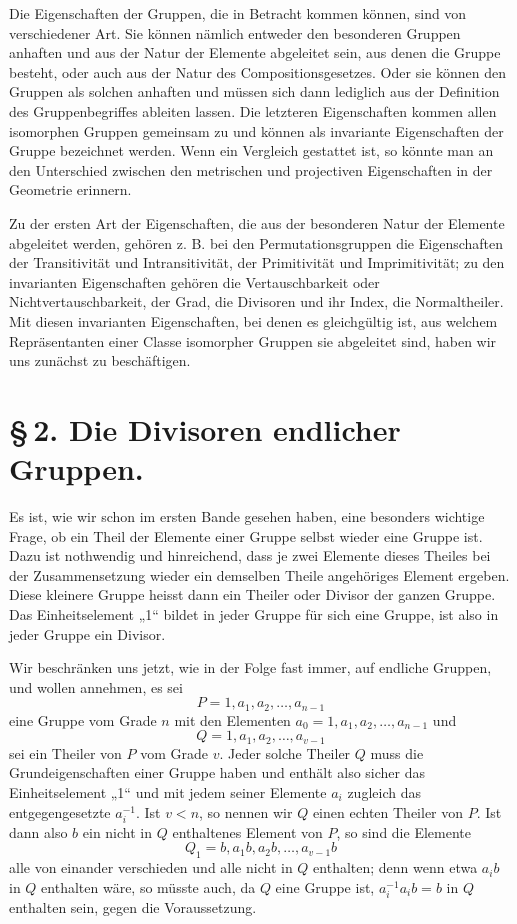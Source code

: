 \documentclass[11pt]{article}
\begin{document}
Die Eigenschaften der Gruppen, die in Betracht kommen können, sind von verschiedener Art. Sie können nämlich entweder den besonderen Gruppen anhaften und aus der Natur der Elemente abgeleitet sein, aus denen die Gruppe besteht, oder auch aus der Natur des Compositionsgesetzes. Oder sie können den Gruppen als solchen anhaften und müssen sich dann lediglich aus der Definition des Gruppenbegriffes ableiten lassen. Die letzteren Eigenschaften kommen allen isomorphen Gruppen gemeinsam zu und können als invariante Eigenschaften der Gruppe bezeichnet werden. Wenn ein Vergleich gestattet ist, so könnte man an den Unterschied zwischen den metrischen und projectiven Eigenschaften in der Geometrie erinnern.

Zu der ersten Art der Eigenschaften, die aus der besonderen Natur der Elemente abgeleitet werden, gehören z. B. bei den Permutationsgruppen die Eigenschaften der Transitivität und Intransitivität, der Primitivität und Imprimitivität; zu den invarianten Eigenschaften gehören die Vertauschbarkeit oder Nichtvertauschbarkeit, der Grad, die Divisoren und ihr Index, die Normaltheiler. Mit diesen invarianten Eigenschaften, bei denen es gleichgültig ist, aus welchem Repräsentanten einer Classe isomorpher Gruppen sie abgeleitet sind, haben wir uns zunächst zu beschäftigen.

\section*{\S\,2. Die Divisoren endlicher Gruppen.}

Es ist, wie wir schon im ersten Bande gesehen haben, eine besonders wichtige Frage, ob ein Theil der Elemente einer Gruppe selbst wieder eine Gruppe ist. Dazu ist nothwendig und hinreichend, dass je zwei Elemente dieses Theiles bei der Zusammensetzung wieder ein demselben Theile angehöriges Element ergeben. Diese kleinere Gruppe heisst dann ein Theiler oder Divisor der ganzen Gruppe. Das Einheitselement „1“ bildet in jeder Gruppe für sich eine Gruppe, ist also in jeder Gruppe ein Divisor.

Wir beschränken uns jetzt, wie in der Folge fast immer, auf endliche Gruppen, und wollen annehmen, es sei
\[
P=1,a_1,a_2,\ldots,a_{n-1}
\]
eine Gruppe vom Grade $n$ mit den Elementen $a_0=1,a_1,a_2,\ldots,a_{n-1}$ und
\[
Q=1,a_1,a_2,\ldots,a_{v-1}
\]
sei ein Theiler von $P$ vom Grade $v$. Jeder solche Theiler $Q$ muss die Grundeigenschaften einer Gruppe haben und enthält also sicher das Einheitselement „1“ und mit jedem seiner Elemente $a_i$ zugleich das entgegengesetzte $a_i^{-1}$. Ist $v<n$, so nennen wir $Q$ einen echten Theiler von $P$. Ist dann also $b$ ein nicht in $Q$ enthaltenes Element von $P$, so sind die Elemente
\[
Q_1=b,a_1b,a_2b,\ldots,a_{v-1}b
\]
alle von einander verschieden und alle nicht in $Q$ enthalten; denn wenn etwa $a_i b$ in $Q$ enthalten wäre, so müsste auch, da $Q$ eine Gruppe ist, $a_i^{-1}a_i b=b$ in $Q$ enthalten sein, gegen die Voraussetzung.
\end{document}
